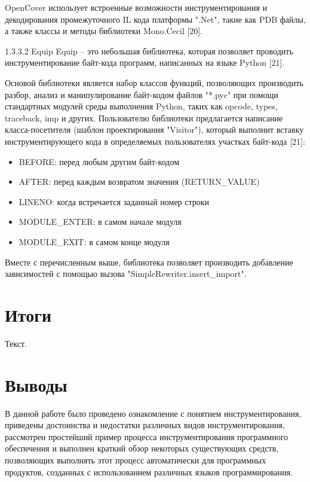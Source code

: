 OpenCover использует встроенные возможности инструментирования и декодирования промежуточного IL кода платформы ".Net", такие как PDB файлы, а также классы и методы библиотеки Mono.Cecil [20].

1.3.3.2 Equip
Equip -- это небольшая библиотека, которая позволяет проводить инструментирование байт-кода программ, написанных на языке Python [21].

Основой библиотеки является набор классов функций, позволяющих производить разбор, анализ и манипулирование байт-кодом файлов "*.pyc" при помощи стандартных модулей среды выполнения Python, таких как opcode, types, traceback, imp и других. Пользователю библиотеки предлагается написание класса-посетителя (шаблон проектирования "Visitor"), который выполнит вставку инструментирующего кода в определяемых пользователях участках байт-кода [21]:

\begin{itemize}
  \item BEFORE: перед любым другим байт-кодом
  \item AFTER: перед каждым возвратом значения (RETURN\_VALUE)
  \item LINENO: когда встречается заданный номер строки
  \item MODULE\_ENTER: в самом начале модуля
  \item MODULE\_EXIT: в самом конце модуля
\end{itemize}

Вместе с перечисленным выше, библиотека позволяет производить добавление зависимостей с помощью вызова "SimpleRewriter.insert\_import".

\section{Итоги}

Текст.

\section{Выводы}

В данной работе было проведено ознакомление с понятием инструментирования, приведены достоинства и недостатки различных видов инструментирования, рассмотрен простейший пример процесса инструментирования программного обеспечения и выполнен краткий обзор некоторых существующих средств, позволяющих выполнять этот процесс автоматически для программных продуктов, созданных с использованием различных языков программирования.
